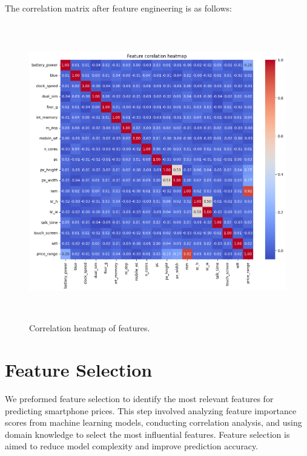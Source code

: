 \documentclass[12pt]{report}
\begin{document}
The correlation matrix after feature engineering is as follows:
\begin{figure}[H]
	\centering
	\includegraphics[height=35em]{corr_viz_after_fe.png}
	\caption{Correlation heatmap of features.}
	\label{corr_viz_after_feature_engineering}
\end{figure}

\section{Feature Selection}
We preformed feature selection to identify the most relevant features for predicting smartphone prices. This step involved analyzing feature importance scores from machine learning models, conducting correlation analysis, and using domain knowledge to select the most influential features. Feature selection is aimed to reduce model complexity and improve prediction accuracy.
\end{document}
